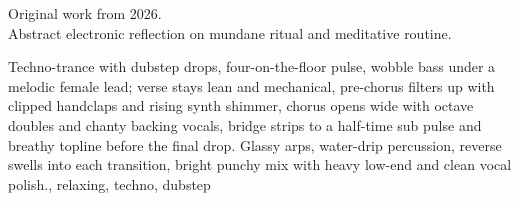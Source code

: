 

\begin{notes}
Original work from 2026.\\
Abstract electronic reflection on mundane ritual and meditative routine.
\end{notes}

\begin{style}
Techno-trance with dubstep drops, four-on-the-floor pulse, wobble bass under a melodic female lead; verse stays lean and mechanical, pre-chorus filters up with clipped handclaps and rising synth shimmer, chorus opens wide with octave doubles and chanty backing vocals, bridge strips to a half-time sub pulse and breathy topline before the final drop. %
Glassy arps, water-drip percussion, reverse swells into each transition, bright punchy mix with heavy low-end and clean vocal polish., relaxing, techno, dubstep
\end{style}

